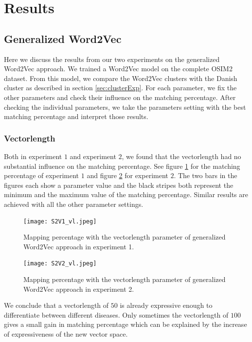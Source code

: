 \section{Results}

\subsection{Generalized Word2Vec}

Here we discuss the results from our two experiments on the generalized Word2Vec approach. We trained a Word2Vec model on the complete OSIM2 dataset. From this model, we compare the Word2Vec clusters with the Danish cluster as described in section \ref{sec:clusterExp}. For each parameter, we fix the other parameters and check their influence on the matching percentage. After checking the individual parameters, we take the parameters setting with the best matching percentage and interpret those results.

\subsubsection{Vectorlength}

Both in experiment $1$ and experiment $2$, we found that the vectorlength had no substantial influence on the matching percentage. See figure \ref{fig:s2v_vl_1} for the matching percentage of experiment $1$ and figure \ref{fig:s2v_vl_2} for experiment $2$. The two bars in the figures each show a parameter value and the black stripes both represent the minimum and the maximum value of the matching percentage. Similar results are achieved with all the other parameter settings. \\

\begin{figure}[!htb]
	\centering
	\texttt{[image: S2V1\_vl.jpeg]}
	\caption{Mapping percentage with the vectorlength parameter of generalized Word2Vec approach in experiment 1.}
	\label{fig:s2v_vl_1}
\end{figure}

\begin{figure}[!htb]
	\centering
	\texttt{[image: S2V2\_vl.jpeg]}
	\caption{Mapping percentage with the vectorlength parameter of generalized Word2Vec approach in experiment 2.}
	\label{fig:s2v_vl_2}
\end{figure}

We conclude that a vectorlength of $50$ is already expressive enough to differentiate between different diseases. Only sometimes the vectorlength of $100$ gives a small gain in matching percentage which can be explained by the increase of expressiveness of the new vector space.

